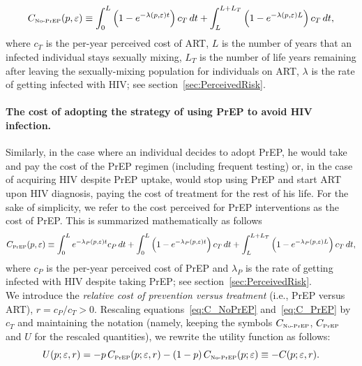 \documentclass[12pt]{article}
\begin{document}
\begin{equation} \label{eq:C_NoPrEP}
	C_{\text{\tiny No-PrEP}}(p,\varepsilon) \equiv \int_ 0^{L} \left(1- e^{-\lambda(p,\varepsilon) t} \right) c_T \,dt + \int_L^{L+L_T} \left(1- e^{-\lambda(p,\varepsilon) L} \right) c_T \,dt,
\end{equation}
where $c_T$ is the per-year perceived cost of ART, $L$ is the number of years that an infected individual stays sexually mixing,  $L_T$ is the number of life years remaining after leaving the sexually-mixing population for individuals on ART, $\lambda$ is the rate of getting infected with HIV; see section~\ref{sec:PerceivedRisk}.

\paragraph{The cost of adopting the strategy of using PrEP to avoid HIV infection.}

Similarly, in the case where an individual decides to adopt PrEP, he would take and pay the cost of {the PrEP regimen (including frequent testing) or, in the case of acquiring HIV despite PrEP uptake, would stop using PrEP and start ART upon HIV diagnosis, paying} the cost of treatment for the rest of his life. {For the sake of simplicity, we refer to the cost perceived for PrEP interventions as the cost of PrEP}. This is summarized mathematically as follows
\begin{equation} \label{eq:C_PrEP}
	C_{\text{\tiny PrEP}}(p,\varepsilon) \equiv \int_ 0^{L} e^{-\lambda_P(p,\varepsilon) t} c_P \,dt + \int_ 0^{L} \left(1- e^{-\lambda_P(p,\varepsilon) t} \right) c_T \,dt + \int_L^{L+L_T} \left(1- e^{-\lambda_P(p,\varepsilon) L} \right) c_T \,dt,
\end{equation}
where $c_P$ is the per-year perceived cost of PrEP and $\lambda_P$ is the rate of getting infected with HIV despite taking PrEP; see section~\ref{sec:PerceivedRisk}. \\

We introduce the \textit{relative cost of prevention versus treatment} (i.e., PrEP versus ART), $r = c_P/c_T>0$. Rescaling equations~\eqref{eq:C_NoPrEP} and~\eqref{eq:C_PrEP} by $c_T$ and maintaining the notation (namely, keeping the symbols $C_{\text{\tiny No-PrEP}}$, $C_{\text{\tiny PrEP}}$ and $U$ for the rescaled quantities), we rewrite the utility function as follows:
\begin{equation}
	U(p;\varepsilon, r) = - p \, C_{\text{\tiny PrEP}}(p;\varepsilon, r) - (1- p) \, C_{\text{\tiny No-PrEP}}(p;\varepsilon)\equiv-C(p;\varepsilon, r).
\end{equation}
\end{document}
